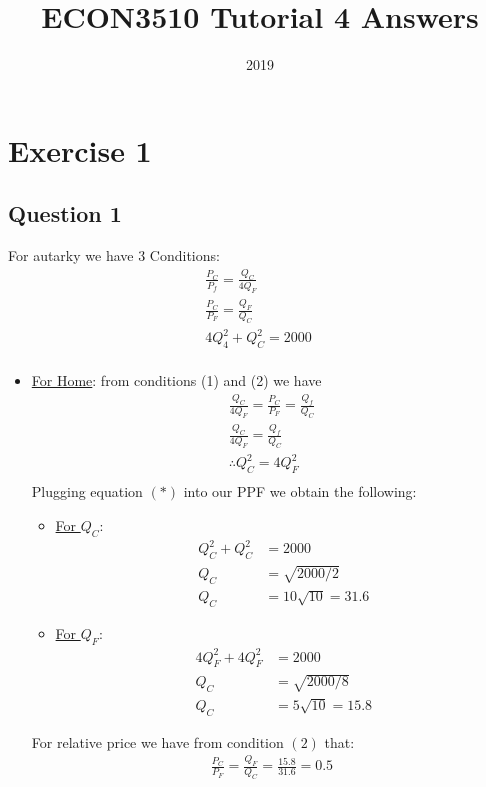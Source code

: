 \documentclass{article}
\title{ECON3510 Tutorial 4 Answers}
\date{2019}
\begin{document}
\maketitle

\section{Exercise 1}
\vspace{6mm}
\subsection{Question 1}

For autarky we have 3 Conditions:
\begin{gather*}
  \tfrac{P_{C}}{P_{f}} = \tfrac{Q_{C}}{4Q_{F}} \ \tag{1} \\
  \tfrac{P_{C}}{P_{F}} = \tfrac{Q_{F}}{Q_{C}} \ \tag{2} \\
  4Q_{4}^{2} + Q_{C}^{2} = 2000 \ \tag{3} \\
\end{gather*}

\begin{itemize}
  \item  \underline{For Home}: from conditions (1) and (2) we have
  \begin{gather*}
    \tfrac{Q_{C}}{4Q_{F}} = \tfrac{P_{C}}{P_{F}} = \tfrac{Q_{f}}{Q_{C}} \\
    \tfrac{Q_{C}}{4Q_{F}} = \tfrac{Q_{f}}{Q_{C}} \\
    \therefore Q_{C}^{2} = 4Q_{F}^{2} \ \tag{*} \\
  \end{gather*}
  Plugging equation $(*)$ into our PPF we obtain the following:
  \begin{itemize}
    \item  \underline{For $Q_{C}$}:
    \begin{align*}
      Q_{C}^{2} + Q_{C}^{2} &= 2000 \\
      Q_{C} &= \sqrt{2000/2} \\
      Q_{C} &= 10\sqrt{10} = 31.6
    \end{align*}
    \item  \underline{For $Q_{F}$}:
    \begin{align*}
      4Q_{F}^{2} + 4Q_{F}^{2} &= 2000 \\
      Q_{C} &= \sqrt{2000/8} \\
      Q_{C} &= 5\sqrt{10} = 15.8
    \end{align*}
  \end{itemize}
  For relative price we have from condition $(2)$ that:
  \begin{gather*}
    \tfrac{P_{C}}{P_{F}} = \tfrac{Q_{F}}{Q_{C}} = \tfrac{15.8}{31.6} = 0.5
  \end{gather*}
\end{itemize}
\end{document}
